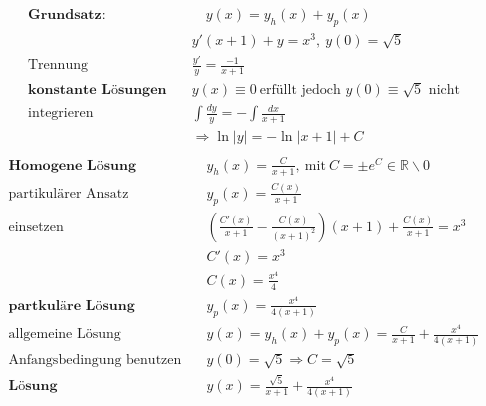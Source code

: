 \begin{equation*}
\begin{split}
\textbf{Grundsatz:} &\quad y(x) = y_h(x) + y_p(x) \\
& y'(x+1) + y = x^3,\ y(0) = \sqrt{5} \\
\text{Trennung}\quad & \frac{y'}{y} = \frac{-1}{x+1} \\
\textbf{konstante L{\"o}sungen}\quad & y(x) \equiv 0\ \text{erf{\"u}llt jedoch $y(0) \equiv \sqrt{5}$ nicht} \\
\text{integrieren}\quad & \int \frac{dy}{y} = - \int \frac{dx}{x+1} \\
& \Rightarrow \ln|y| = -\ln|x+1| + C \\
\end{split}
\end{equation*}
\begin{equation*}
\begin{split}
\textbf{Homogene L{\"o}sung} \quad & y_h(x) = \frac{C}{x+1},\ \text{mit}\ C= \pm e^C \in \mathbb{R}\backslash{0} \\
\text{partikul{\"a}rer Ansatz}\quad & y_p(x) = \frac{C(x)}{x+1} \\
\text{einsetzen} \quad & (\frac{C'(x)}{x+1} - \frac{C(x)}{(x+1)^2})(x+1) + \frac{C(x)}{x+1} = x^3 \\
& C'(x) = x^3 \\
& C(x) = \frac{x^4}{4} \\
\textbf{partkul{\"a}re L{\"o}sung} \quad & y_p(x) = \frac{x^4}{4(x+1)} \\
\text{allgemeine L{\"o}sung}\quad & y(x) = y_h(x) + y_p(x) = \frac{C}{x+1} + \frac{x^4}{4(x+1)} \\
\text{Anfangsbedingung benutzen} \quad & y(0) = \sqrt{5} \Rightarrow C = \sqrt{5} \\
\textbf{L{\"o}sung} \quad & y(x) = \frac{\sqrt{5}}{x+1} + \frac{x^4}{4(x+1)}
\end{split}
\end{equation*}

%



